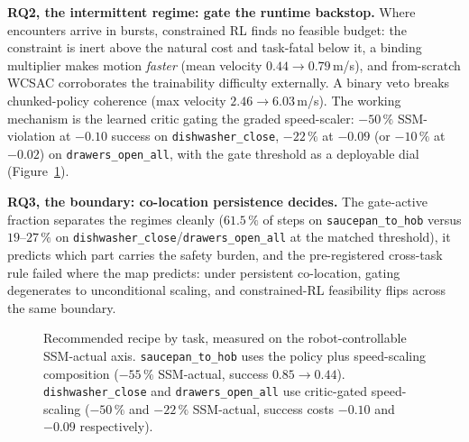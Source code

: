 \documentclass[11pt,a4paper]{report}
\newcommand{\ssm}{SSM}
\begin{document}
\textbf{RQ2, the intermittent regime: gate the runtime backstop.}
Where encounters arrive in bursts, constrained RL finds no feasible
budget: the constraint is inert above the natural cost and
task-fatal below it, a binding multiplier makes motion \emph{faster}
(mean velocity $0.44 \to 0.79$\,m/s), and from-scratch WCSAC
corroborates the trainability difficulty externally. A binary veto
breaks chunked-policy coherence (max velocity $2.46 \to 6.03$\,m/s).
The working mechanism is the learned critic gating the graded
speed-scaler: $-50\,\%$ \ssm{}-violation at $-0.10$ success on
\texttt{dishwasher\_close}, $-22\,\%$ at $-0.09$ (or $-10\,\%$ at $-0.02$) on
\texttt{drawers\_open\_all}, with the gate threshold as a deployable dial
(Figure~\ref{fig:r2-reduction-bars}).

\textbf{RQ3, the boundary: co-location persistence decides.} The
gate-active fraction separates the regimes cleanly ($61.5\,\%$ of
steps on \texttt{saucepan\_to\_hob} versus $19$--$27\,\%$ on
\texttt{dishwasher\_close}/\texttt{drawers\_open\_all} at the
matched threshold), it predicts which part carries the safety burden,
and the pre-registered cross-task rule failed where the map
predicts: under persistent co-location, gating degenerates to
unconditional scaling, and constrained-RL feasibility flips across
the same boundary.

\begin{figure}[htbp]
\centering
{}
\caption{Recommended recipe by task, measured on the robot-controllable
\ssm{}-actual axis. \texttt{saucepan\_to\_hob} uses the policy plus
speed-scaling composition ($-55\,\%$ \ssm{}-actual, success
$0.85 \to 0.44$). \texttt{dishwasher\_close} and
\texttt{drawers\_open\_all} use critic-gated speed-scaling
($-50\,\%$ and $-22\,\%$ \ssm{}-actual, success costs $-0.10$ and
$-0.09$ respectively).}
\label{fig:r2-reduction-bars}
\end{figure}
\end{document}
